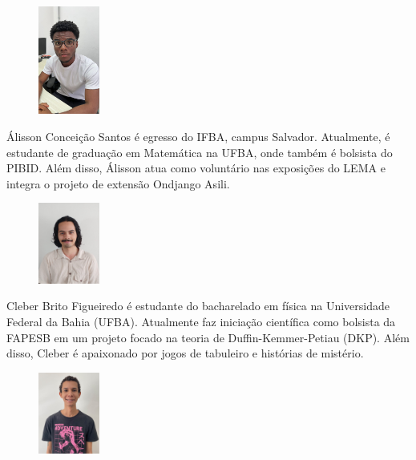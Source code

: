 \documentclass[onecolumn]{hipatia}
\begin{document}
\begin{center}
\begin{minipage}{12cm}
\vspace{0.2cm}
\begin{figure}
	\vspace{-10pt}
	\centering
	\includegraphics[width=2cm]{alisson.jpeg}
\end{figure}
Álisson Conceição Santos é egresso do IFBA, campus Salvador. Atualmente, é estudante de graduação em Matemática na UFBA, onde também é bolsista do PIBID. Além disso, Álisson atua como voluntário nas exposições do LEMA e integra o projeto de extensão Ondjango Asili. 
\end{minipage}
\begin{minipage}{12cm}
	\vspace{0.3cm}
\begin{figure}
	\vspace{-10pt}
	\centering
	\includegraphics[width=2cm]{cleber.jpeg}
\end{figure}
Cleber Brito Figueiredo é estudante do bacharelado em física na Universidade Federal da Bahia (UFBA). Atualmente faz iniciação científica como bolsista da FAPESB em um projeto focado na teoria de Duffin-Kemmer-Petiau (DKP). Além disso, Cleber é apaixonado por jogos de tabuleiro e histórias de mistério.
\end{minipage}
\begin{minipage}{12cm}
	\vspace{0.3cm}
\begin{figure}
	\vspace{-10pt}
	\centering
	\includegraphics[width=2cm]{Eldon.png}

\end{figure}
\end{minipage}
\end{center}
\end{document}
